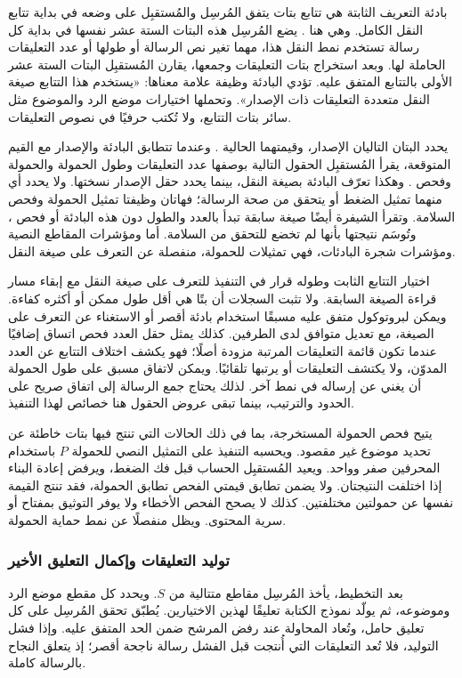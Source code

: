 بادئة التعريف الثابتة هي تتابع بتات يتفق المُرسِل والمُستقبِل على وضعه في بداية تتابع النقل الكامل. وهي هنا \EN{\texttt{\McMarkerString}}. يضع المُرسِل هذه البتات الستة عشر نفسها في بداية كل رسالة تستخدم نمط النقل هذا، مهما تغير نص الرسالة أو طولها أو عدد التعليقات الحاملة لها. وبعد استخراج بتات التعليقات وجمعها، يقارن المُستقبِل البتات الستة عشر الأولى بالتتابع المتفق عليه. تؤدي البادئة وظيفة علامة معناها: «يستخدم هذا التتابع صيغة النقل متعددة التعليقات ذات الإصدار». وتحملها اختيارات موضع الرد والموضوع مثل سائر بتات التتابع، ولا تُكتب حرفيًا في نصوص التعليقات.

يحدد البتان التاليان الإصدار، وقيمتهما الحالية \EN{\texttt{\McVersionString}}. وعندما تتطابق البادئة والإصدار مع القيم المتوقعة، يقرأ المُستقبِل الحقول التالية بوصفها عدد التعليقات وطول الحمولة والحمولة وفحص . وهكذا تعرّف البادئة بصيغة النقل، بينما يحدد حقل الإصدار نسختها. ولا يحدد أي منهما تمثيل الضغط أو يتحقق من صحة الرسالة؛ فهاتان وظيفتا تمثيل الحمولة وفحص السلامة. وتقرأ الشيفرة أيضًا صيغة سابقة تبدأ بالعدد والطول دون هذه البادئة أو فحص ، وتُوسَم نتيجتها بأنها لم تخضع للتحقق من السلامة. أما  ومؤشرات المقاطع النصية ومؤشرات شجرة البادئات، فهي تمثيلات للحمولة، منفصلة عن التعرف على صيغة النقل.

اختيار التتابع الثابت وطوله قرار في التنفيذ للتعرف على صيغة النقل مع إبقاء مسار قراءة الصيغة السابقة. ولا تثبت السجلات أن  بتًا هي أقل طول ممكن أو أكثره كفاءة. ويمكن لبروتوكول متفق عليه مسبقًا استخدام بادئة أقصر أو الاستغناء عن التعرف على الصيغة، مع تعديل متوافق لدى الطرفين. كذلك يمثل حقل العدد فحص اتساق إضافيًا عندما تكون قائمة التعليقات المرتبة مزودة أصلًا؛ فهو يكشف اختلاف التتابع عن العدد المدوّن، ولا يكتشف التعليقات أو يرتبها تلقائيًا. ويمكن لاتفاق مسبق على طول الحمولة أن يغني عن إرساله في نمط آخر. لذلك يحتاج جمع الرسالة إلى اتفاق صريح على الحدود والترتيب، بينما تبقى عروض الحقول هنا خصائص لهذا التنفيذ.

يتيح  فحص الحمولة المستخرجة، بما في ذلك الحالات التي تنتج فيها بتات خاطئة عن تحديد موضوع غير مقصود. ويحسبه التنفيذ على التمثيل النصي للحمولة $P$ باستخدام المحرفين صفر وواحد. ويعيد المُستقبِل الحساب قبل فك الضغط، ويرفض إعادة البناء إذا اختلفت النتيجتان. ولا يضمن تطابق قيمتي الفحص تطابق الحمولة، فقد تنتج القيمة نفسها عن حمولتين مختلفتين. كذلك لا يصحح الفحص الأخطاء ولا يوفر التوثيق بمفتاح أو سرية المحتوى. ويظل منفصلًا عن نمط حماية الحمولة.

\subsubsection{توليد التعليقات وإكمال التعليق الأخير}
بعد التخطيط، يأخذ المُرسِل مقاطع متتالية من $S$. ويحدد كل مقطع موضع الرد وموضوعه، ثم يولّد نموذج الكتابة تعليقًا لهذين الاختيارين. يُطبّق تحقق المُرسِل على كل تعليق حامل، وتُعاد المحاولة عند رفض المرشح ضمن الحد المتفق عليه. وإذا فشل التوليد، فلا تُعد التعليقات التي أُنتجت قبل الفشل رسالة ناجحة أقصر؛ إذ يتعلق النجاح بالرسالة كاملة.

